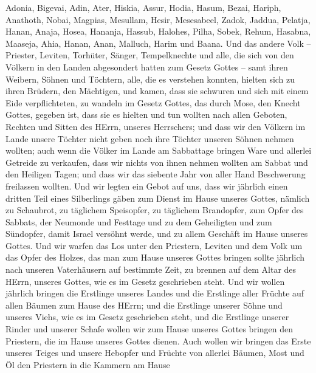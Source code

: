 Adonia, Bigevai, Adin,  Ater, Hiskia, Assur, 
Hodia, Hasum, Bezai,  Hariph, Anathoth, Nobai,
 Magpias, Mesullam, Hesir,  Mesesabeel, Zadok,
Jaddua,  Pelatja, Hanan, Anaja,  Hosea,
Hananja, Hassub,  Halohes, Pilha, Sobek, 
Rehum, Hasabna, Maaseja,  Ahia, Hanan, Anan, 
Malluch, Harim und Baana.  Und das andere Volk -- Priester,
Leviten, Torhüter, Sänger, Tempelknechte und alle, die sich von den
Völkern in den Landen abgesondert hatten zum Gesetz Gottes -- samt ihren
Weibern, Söhnen und Töchtern, alle, die es verstehen konnten,
 hielten sich zu ihren Brüdern, den Mächtigen, und kamen,
dass sie schwuren und sich mit einem Eide verpflichteten, zu wandeln im
Gesetz Gottes, das durch Mose, den Knecht Gottes, gegeben ist, dass sie
es hielten und tun wollten nach allen Geboten, Rechten und Sitten des
HErrn, unseres Herrschers;  und dass wir den Völkern im
Lande unsere Töchter nicht geben noch ihre Töchter unseren Söhnen nehmen
wollten;  auch wenn die Völker im Lande am Sabbattage
bringen Ware und allerlei Getreide zu verkaufen, dass wir nichts von
ihnen nehmen wollten am Sabbat und den Heiligen Tagen; und dass wir das
siebente Jahr von aller Hand Beschwerung freilassen wollten.
 Und wir legten ein Gebot auf uns, dass wir jährlich einen
dritten Teil eines Silberlings gäben zum Dienst im Hause unseres Gottes,
 nämlich zu Schaubrot, zu täglichem Speisopfer, zu
täglichem Brandopfer, zum Opfer des Sabbats, der Neumonde und Festtage
und zu dem Geheiligten und zum Sündopfer, damit Israel versöhnt werde,
und zu allem Geschäft im Hause unseres Gottes.  Und wir
warfen das Los unter den Priestern, Leviten und dem Volk um das Opfer
des Holzes, das man zum Hause unseres Gottes bringen sollte jährlich
nach unseren Vaterhäusern auf bestimmte Zeit, zu brennen auf dem Altar
des HErrn, unseres Gottes, wie es im Gesetz geschrieben steht.
 Und wir wollen jährlich bringen die Erstlinge unseres
Landes und die Erstlinge aller Früchte auf allen Bäumen zum Hause des
HErrn;  und die Erstlinge unserer Söhne und unseres Viehs,
wie es im Gesetz geschrieben steht, und die Erstlinge unserer Rinder und
unserer Schafe wollen wir zum Hause unseres Gottes bringen den
Priestern, die im Hause unseres Gottes dienen.  Auch wollen
wir bringen das Erste unseres Teiges und unsere Hebopfer und Früchte von
allerlei Bäumen, Most und Öl den Priestern in die Kammern am Hause

